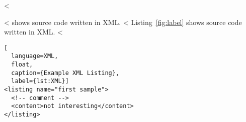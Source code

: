 <%

<%
 shows source code written in XML.
<%
Listing~\ref{fig:label} shows source code written in XML.
<%

\begin{LTXexample}
\begin{lstlisting}[
  language=XML,
  float,
  caption={Example XML Listing},
  label={lst:XML}]
<listing name="first sample">
  <!-- comment -->
  <content>not interesting</content>
</listing>
\end{lstlisting}
\end{LTXexample}
